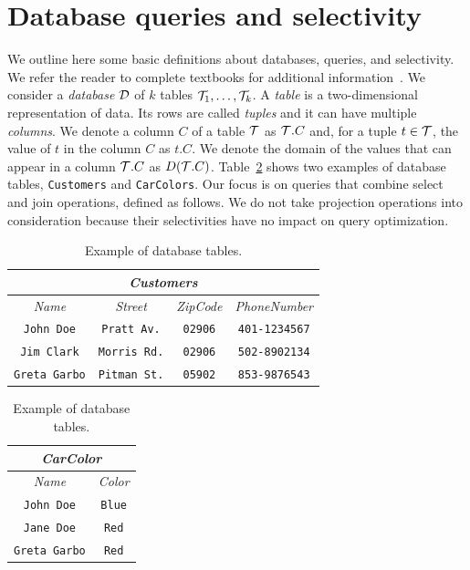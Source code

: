 \section{Database queries and selectivity}\label{sec:vcfreqprelim}
We outline here some basic definitions about databases, queries, and
selectivity. We refer the reader to complete textbooks for additional
information~\citep{GarciaMolinaUW02}.
We consider a \emph{database} ${\cal D}$ of $k$ tables ${\cal T}_1,\dotsc,{\cal T}_k$. 
A \emph{table} is a two-dimensional representation of data. Its rows are called
\emph{tuples} and it can have multiple \emph{columns}.  We denote a
column $C$ of a table ${\cal T}$ as ${\cal T}.C$ and, for a tuple $t\in{\cal T}$, the value
of $t$ in the column $C$ as $t.C$. We denote the domain of the values that can
appear in a column ${\cal T}.C$ as $D({\cal T}.C)$. Table~\ref{tab:example} shows two
examples of database tables, \texttt{Customers} and \texttt{CarColors}. Our
focus is on queries that combine select and join operations, defined as follows.
We do not take projection operations into consideration because their
selectivities have no impact on query optimization.

\begin{table}[htb]
  \centering
    \caption{Example of database tables.}
  \begin{tabular}{c|c|c|c}
    \toprule
    \multicolumn{4}{c}{\emph{Customers}} \\
    \midrule
    \emph{Name} & \emph{Street} & \emph{ZipCode} & \emph{PhoneNumber} \\
    \midrule
    \texttt{John Doe} & \texttt{Pratt Av.} & \texttt{02906} & \texttt{401-1234567} \\
    \texttt{Jim Clark} & \texttt{Morris Rd.} & \texttt{02906} & \texttt{502-8902134} \\
    \texttt{Greta Garbo} & \texttt{Pitman St.} & \texttt{05902} & \texttt{853-9876543} \\
    \bottomrule
  \end{tabular}
  \hfill
  \begin{tabular}{c|c}
    \toprule
    \multicolumn{2}{c}{\emph{CarColor}} \\
    \midrule
    \emph{Name} & \emph{Color} \\
    \midrule
    \texttt{John Doe} & \texttt{Blue} \\
    \texttt{Jane Doe} & \texttt{Red} \\
    \texttt{Greta Garbo} & \texttt{Red}\\ 
    \bottomrule
  \end{tabular}
  \label{tab:example}
\end{table}

